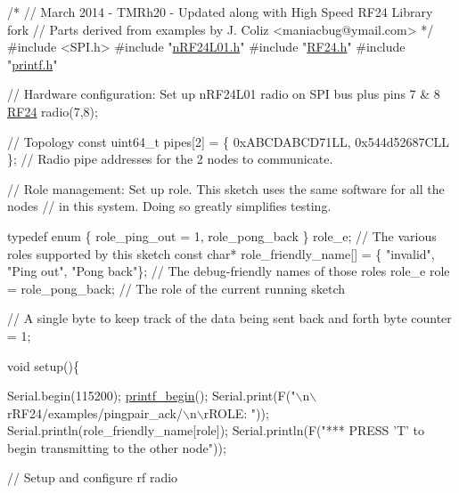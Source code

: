 \begin{DoxyCodeInclude}
\textcolor{comment}{/*}
\textcolor{comment}{  // March 2014 - TMRh20 - Updated along with High Speed RF24 Library fork}
\textcolor{comment}{  // Parts derived from examples by J. Coliz <maniacbug@ymail.com>}
\textcolor{comment}{*/}
\textcolor{preprocessor}{#include <SPI.h>}
\textcolor{preprocessor}{#include "\hyperlink{nRF24L01_8h}{nRF24L01.h}"}
\textcolor{preprocessor}{#include "\hyperlink{RF24_8h}{RF24.h}"}
\textcolor{preprocessor}{#include "\hyperlink{printf_8h}{printf.h}"}

\textcolor{comment}{// Hardware configuration: Set up nRF24L01 radio on SPI bus plus pins 7 & 8 }
\hyperlink{classRF24}{RF24} radio(7,8);

\textcolor{comment}{// Topology}
\textcolor{keyword}{const} uint64\_t pipes[2] = \{ 0xABCDABCD71LL, 0x544d52687CLL \};              \textcolor{comment}{// Radio pipe addresses for the
       2 nodes to communicate.}

\textcolor{comment}{// Role management: Set up role.  This sketch uses the same software for all the nodes}
\textcolor{comment}{// in this system.  Doing so greatly simplifies testing.  }

\textcolor{keyword}{typedef} \textcolor{keyword}{enum} \{ role\_ping\_out = 1, role\_pong\_back \} role\_e;                 \textcolor{comment}{// The various roles supported
       by this sketch}
\textcolor{keyword}{const} \textcolor{keywordtype}{char}* role\_friendly\_name[] = \{ \textcolor{stringliteral}{"invalid"}, \textcolor{stringliteral}{"Ping out"}, \textcolor{stringliteral}{"Pong back"}\};  \textcolor{comment}{// The debug-friendly names of
       those roles}
role\_e role = role\_pong\_back;                                              \textcolor{comment}{// The role of the current
       running sketch}

\textcolor{comment}{// A single byte to keep track of the data being sent back and forth}
byte counter = 1;

\textcolor{keywordtype}{void} setup()\{

  Serial.begin(115200);
  \hyperlink{printf_8h_afc0d9ca32710dff550ebe56ab6b39d23}{printf\_begin}();
  Serial.print(F(\textcolor{stringliteral}{"\(\backslash\)n\(\backslash\)rRF24/examples/pingpair\_ack/\(\backslash\)n\(\backslash\)rROLE: "}));
  Serial.println(role\_friendly\_name[role]);
  Serial.println(F(\textcolor{stringliteral}{"*** PRESS 'T' to begin transmitting to the other node"}));

  \textcolor{comment}{// Setup and configure rf radio}


\end{DoxyCodeInclude}
